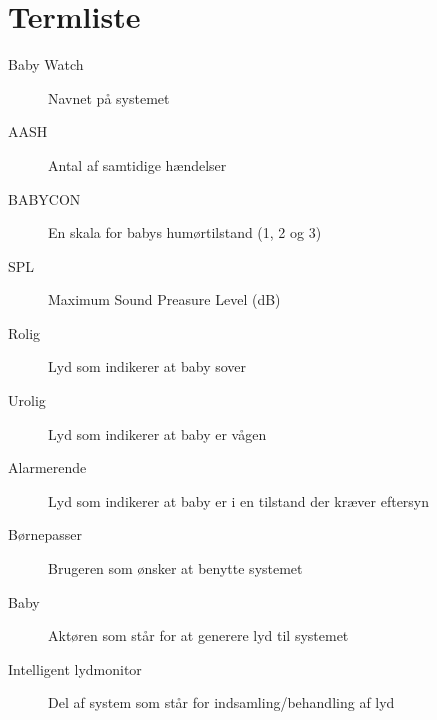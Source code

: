 \chapter{Termliste}


\begin{description}
\item[Baby Watch] Navnet på systemet
\item[AASH] Antal af samtidige hændelser
\item[BABYCON] En skala for babys humørtilstand (1, 2 og 3)
\item[SPL] Maximum Sound Preasure Level (dB)
\item[Rolig] Lyd som indikerer at baby sover
\item[Urolig] Lyd som indikerer at baby er vågen
\item[Alarmerende] Lyd som indikerer at baby er i en tilstand der kræver eftersyn
\item[Børnepasser] Brugeren som ønsker at benytte systemet
\item[Baby] Aktøren som står for at generere lyd til systemet
\item[Intelligent lydmonitor] Del af system som står for indsamling/behandling af lyd
\end{description}